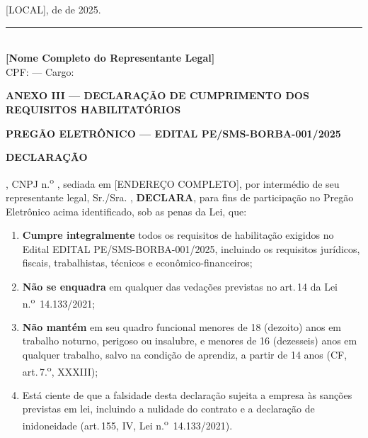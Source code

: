\documentclass[12pt,a4paper]{article}
\newcommand{\art}[1]{art.\,#1}
\newcommand{\editalNum}{EDITAL PE/SMS-BORBA-001/2025}
\newcommand{\exercicio}{2025}
\begin{document}
\vspace{0.8cm}
\begin{center}
[LOCAL], \underline{\hspace{1cm}} de \underline{\hspace{2.5cm}} de \exercicio.
\end{center}

\vspace{0.8cm}
\begin{center}
\rule{8cm}{0.5pt}\\[3pt]
\textbf{[Nome Completo do Representante Legal]}\\
\small CPF: \underline{\hspace{3cm}} --- Cargo: \underline{\hspace{3cm}}
\end{center}

\clearpage
\begin{center}
  \textbf{\large\color{navy}ANEXO III --- DECLARAÇÃO DE CUMPRIMENTO DOS
    REQUISITOS HABILITATÓRIOS}
\end{center}

\vspace{0.5cm}
\noindent\textbf{PREGÃO ELETRÔNICO --- \editalNum}

\bigskip
\noindent\textbf{DECLARAÇÃO}

\bigskip
{}, CNPJ n.\textsuperscript{o} \underline{\hspace{3cm}},
sediada em [ENDEREÇO COMPLETO], por intermédio de seu representante legal,
Sr./Sra. \underline{\hspace{4cm}}, \textbf{DECLARA}, para fins de participação
no Pregão Eletrônico acima identificado, sob as penas da Lei, que:

\begin{enumerate}
  \item \textbf{Cumpre integralmente} todos os requisitos de habilitação exigidos
    no Edital \editalNum, incluindo os requisitos jurídicos, fiscais, trabalhistas,
    técnicos e econômico-financeiros;
  \item \textbf{Não se enquadra} em qualquer das vedações previstas no \art{14}
    da Lei n.\textsuperscript{o}~14.133/2021;
  \item \textbf{Não mantém} em seu quadro funcional menores de 18 (dezoito) anos
    em trabalho noturno, perigoso ou insalubre, e menores de 16 (dezesseis) anos
    em qualquer trabalho, salvo na condição de aprendiz, a partir de 14 anos (CF,
    \art{7.\textsuperscript{o}}, XXXIII);
  \item Está ciente de que a falsidade desta declaração sujeita a empresa às
    sanções previstas em lei, incluindo a nulidade do contrato e a declaração
    de inidoneidade (\art{155}, IV, Lei n.\textsuperscript{o}~14.133/2021).
\end{enumerate}
\end{document}
